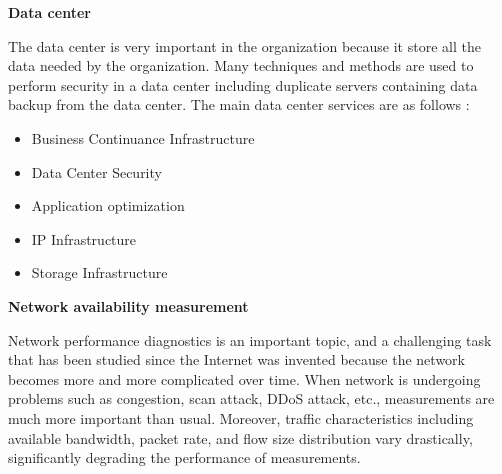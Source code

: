 \documentclass[english]{tktltiki2}
\theoremstyle{definition}
\theoremstyle{remark}
\begin{document}
\begin{flushleft}
\textbf{Data center}
\end{flushleft}
The data center is very important in the organization because it store all the data needed by the organization.  Many techniques and methods are used to perform security in a data center including duplicate servers containing data backup from the data center. The main data center services are as follows \cite{8230012}: \\
\begin{itemize}
\item Business Continuance Infrastructure
\item Data Center Security
\item Application optimization
\item IP Infrastructure
\item Storage Infrastructure
\end{itemize}

\begin{flushleft}
\textbf{Network availability measurement}
\end{flushleft}
Network performance diagnostics is an important topic, and a challenging task that has been studied since the Internet was invented because the network becomes  more and more complicated over time. 
When network is undergoing problems such as congestion, scan attack, DDoS attack, etc., measurements are much more important than usual. Moreover, traffic characteristics including available bandwidth, packet rate, and flow size distribution vary drastically, significantly degrading the performance of measurements.
\end{document}
